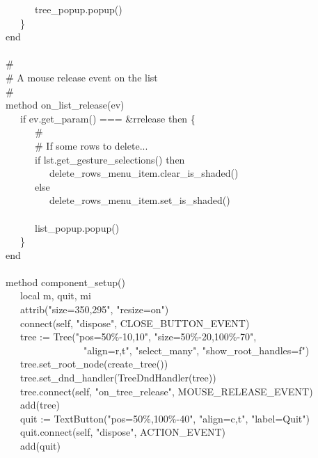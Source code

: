 {\>   \ \ \ \ \ \ tree\_popup.popup() \\
\>   \ \ \ \} \\
\>   end \\
\ \\
\>   \# \\
\>   \# A mouse release event on the list \\
\>   \# \\
\>   method on\_list\_release(ev) \\
\>   \ \ \ if ev.get\_param() === \&rrelease then \{ \\
\>   \ \ \ \ \ \ \# \\
\>   \ \ \ \ \ \ \# If some rows to delete... \\
\>   \ \ \ \ \ \ if lst.get\_gesture\_selections() then \\
\>   \ \ \ \ \ \ \ \ \ delete\_rows\_menu\_item.clear\_is\_shaded() \\
\>   \ \ \ \ \ \ else \\
\>   \ \ \ \ \ \ \ \ \ delete\_rows\_menu\_item.set\_is\_shaded() \\
\ \\
\>   \ \ \ \ \ \ list\_popup.popup() \\
\>   \ \ \ \} \\
\>   end \\
\ \\
\>   method component\_setup() \\
\>   \ \ \ local m, quit, mi \\
\>   \ \ \ attrib("size=350,295", "resize=on") \\
\>   \ \ \ connect(self, "dispose", CLOSE\_BUTTON\_EVENT) \\
\>   \ \ \ tree := Tree("pos=50\%-10,10", "size=50\%-20,100\%-70", \\
\>   \ \ \ \ \ \ \ \ \ \ \ \ \ \ \ \ "align=r,t", "select\_many",
"show\_root\_handles=f") \\
\>   \ \ \ tree.set\_root\_node(create\_tree()) \\
\>   \ \ \ tree.set\_dnd\_handler(TreeDndHandler(tree)) \\
\>   \ \ \ tree.connect(self, "on\_tree\_release", MOUSE\_RELEASE\_EVENT) \\
\>   \ \ \ add(tree) \\
\>   \ \ \ quit := TextButton("pos=50\%,100\%-40", "align=c,t", "label=Quit") \\
\>   \ \ \ quit.connect(self, "dispose", ACTION\_EVENT) \\
\>   \ \ \ add(quit) \\
}
